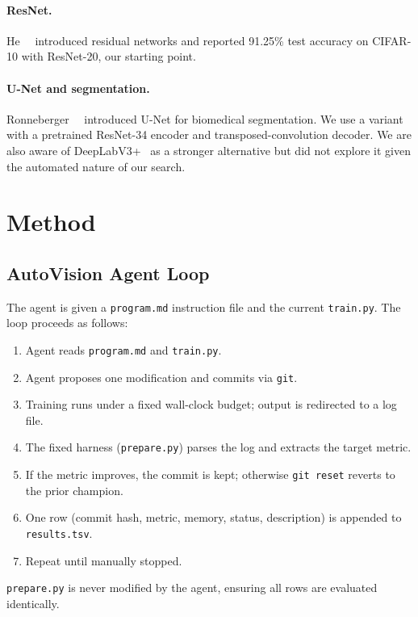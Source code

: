 \documentclass[10pt,twocolumn,letterpaper]{article}
\begin{document}
\paragraph{ResNet.}
He~\etal~\cite{he2016deep} introduced residual networks and reported
91.25\% test accuracy on CIFAR-10 with ResNet-20, our starting point.

\paragraph{U-Net and segmentation.}
Ronneberger~\etal~\cite{ronneberger2015u} introduced U-Net for
biomedical segmentation.
We use a variant with a pretrained ResNet-34 encoder and
transposed-convolution decoder.
We are also aware of DeepLabV3+~\cite{chen2018encoder} as a stronger
alternative but did not explore it given the automated nature of our
search.

\section{Method}

\subsection{AutoVision Agent Loop}

The agent is given a \texttt{program.md} instruction file and the
current \texttt{train.py}.
The loop proceeds as follows:
\begin{enumerate}
  \item Agent reads \texttt{program.md} and \texttt{train.py}.
  \item Agent proposes one modification and commits via \texttt{git}.
  \item Training runs under a fixed wall-clock budget; output is
    redirected to a log file.
  \item The fixed harness (\texttt{prepare.py}) parses the log and
    extracts the target metric.
  \item If the metric improves, the commit is kept; otherwise
    \texttt{git reset} reverts to the prior champion.
  \item One row (commit hash, metric, memory, status, description)
    is appended to \texttt{results.tsv}.
  \item Repeat until manually stopped.
\end{enumerate}
\texttt{prepare.py} is never modified by the agent, ensuring all rows
are evaluated identically.
\end{document}
